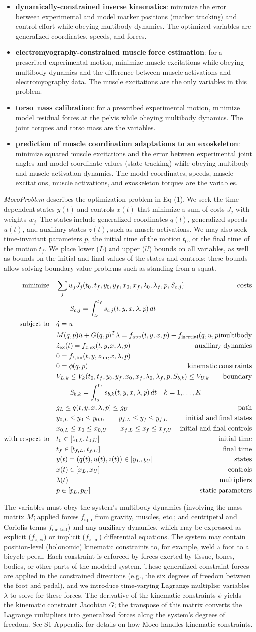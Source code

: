 \documentclass[10pt,letterpaper]{article}
\newcommand{\ocp}{
\begin{align}
    \begin{aligned}
        \mbox{minimize}
         \quad & \sum_j w_{j} J_{j}(t_0, t_f, y_0, y_f, x_{0}, \mathrlap{x_{f}, \lambda_0, \lambda_f, p, S_{c,j})} & \textrm{costs} \\
        & \quad\quad S_{c,j} = \int_{t_0}^{t_f} s_{c,j}(t, y, x, \lambda, p)\,dt  \\
        \mbox{subject to}
         \quad & \dot{q} = u \\
         & \mathrlap{M(q, p)\dot{u} + G(q, p)^T \lambda = f_{\mathrm{app}}(t, y, x, p) - f_{\mathrm{inertial}}(q, u, p)}  & \textrm{multibody} \\
         & \dot{z}_\textrm{ex}(t) = f_{\dot{z},\textrm{ex}}(t, y, x, \lambda, p) & \textrm{auxiliary dynamics} \\
         & 0 = f_{\dot{z},\textrm{im}}(t, y, \dot{z}_{\textrm{im}}, x, \lambda, p) \\
         & 0 = \phi(q, p) & \textrm{kinematic constraints} \\
         & V_{L,k} \leq V_k(t_0, t_f, y_0, y_f, x_{0}, x_{f}, \lambda_0, \lambda_f, p, \mathrlap{S_{b,k}) \leq V_{U,k}} & \textrm{boundary} \\
         & \quad\quad S_{b,k} = \mathrlap{\int_{t_0}^{t_f} s_{b,k}(t, y, x, \lambda, p)\,dt \quad k = 1, \ldots, K}\\
         & g_{L} \leq g(t, y, x, \lambda, p) \leq g_{U} & \textrm{path} \\
         & y_{0,L} \leq y_0 \leq y_{0,U} \quad\quad y_{f,L} \leq y_f \leq y_{f,U} & \textrm{initial and final states} \\
         & x_{0,L} \leq x_0 \leq x_{0,U} \quad\quad x_{f,L} \leq x_f \leq x_{f,U} & \textrm{initial and final controls} \\
         \mbox{with respect to} \quad
         & t_0 \in [t_{0,L}, t_{0,U}] & \textrm{initial time} \\
         & t_f \in [t_{f,L}, t_{f,U}] & \textrm{final time} \\
         & y(t) = (q(t), u(t), z(t)) \in [y_{L}, y_{U}] & \textrm{states} \\
         & x(t) \in [x_{L}, x_{U}] & \textrm{controls} \\
         & \lambda(t) & \textrm{multipliers} \\
         & p \in [p_{L}, p_{U}] & \textrm{static parameters}
    \end{aligned}
\end{align}
}
\begin{document}
\begin{itemize}
\item \textbf{dynamically-constrained inverse kinematics}: minimize the error between experimental and model marker positions (marker tracking) and control effort while obeying multibody dynamics. The optimized variables are generalized coordinates, speeds, and forces.
\item \textbf{electromyography-constrained muscle force estimation}: for a prescribed experimental motion, minimize muscle excitations while obeying multibody dynamics and the difference between muscle activations and electromyography data. The muscle excitations are the only variables in this problem.
\item \textbf{torso mass calibration}: for a prescribed experimental motion, minimize model residual forces at the pelvis while obeying multibody dynamics. The joint torques and torso mass are the variables.
\item \textbf{prediction of muscle coordination adaptations to an exoskeleton}: minimize squared muscle excitations and the error between experimental joint angles and model coordinate values (state tracking) while obeying multibody and muscle activation dynamics. The model coordinates, speeds, muscle excitations, muscle activations, and exoskeleton torques are the variables.
\end{itemize}
\textit{MocoProblem} describes the optimization problem in Eq (1). We seek the time-dependent states $y(t)$ and controls $x(t)$ that minimize a sum of costs $J_j$ with weights $w_j$. The states include generalized coordinates $q(t)$, generalized speeds $u(t)$, and auxiliary states $z(t)$, such as muscle activations. We may also seek time-invariant parameters $p$, the initial time of the motion $t_0$, or the final time of the motion $t_f$. We place lower ($L$) and upper ($U$) bounds on all variables, as well as bounds on the initial and final values of the states and controls; these bounds allow solving boundary value problems such as standing from a squat.

\ocp

The variables must obey the system's multibody dynamics (involving the mass matrix $M$; applied forces $f_\mathrm{app}$ from gravity, muscles, etc.; and centripetal and Coriolis terms $f_\mathrm{inertial}$) and any auxiliary dynamics, which may be expressed as explicit ($f_{\dot{z},\mathrm{ex}}$) or implicit ($f_{\dot{z},\mathrm{im}}$) differential equations. The system may contain position-level (holonomic) kinematic constraints to, for example, weld a foot to a bicycle pedal. Each constraint is enforced by forces exerted by tissue, bones, bodies, or other parts of the modeled system. These generalized constraint forces are applied in the constrained directions (e.g., the six degrees of freedom between the foot and pedal), and we introduce time-varying Lagrange multiplier variables $\lambda$ to solve for these forces. The derivative of the kinematic constraints $\phi$ yields the kinematic constraint Jacobian $G$; the transpose of this matrix converts the Lagrange multipliers into generalized forces along the system's degrees of freedom. See S1 Appendix for details on how Moco handles kinematic constraints.
\end{document}
